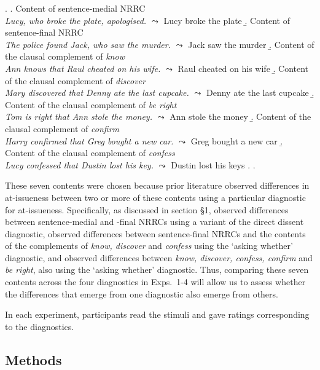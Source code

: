 \documentclass[times,linguex,xcolor]{glossa}
\begin{document}
  \ex.\label{stims}
    \a.\label{stims.a} Content of sentence-medial NRRC \\
      \emph{Lucy, who broke the plate, apologised.} $\leadsto$ Lucy broke the plate
    \b.\label{stims.b} Content of sentence-final NRRC \\
    \emph{The police found Jack, who saw the murder.} $\leadsto$ Jack saw the murder
    \b.\label{stims.c} Content of the clausal complement of \emph{know} \\
    \emph{Ann knows that Raul cheated on his wife.} $\leadsto$ Raul cheated on his wife
    \b.\label{stims.d} Content of the clausal complement of \emph{discover} \\
    \emph{Mary discovered that Denny ate the last cupcake.} $\leadsto$ Denny ate the last cupcake
    \b.\label{stims.e} Content of the clausal complement of \emph{be right} \\
    \emph{Tom is right that Ann stole the money.} $\leadsto$ Ann stole the money
    \b.\label{stims.f} Content of the clausal complement of \emph{confirm} \\
    \emph{Harry confirmed that Greg bought a new car.} $\leadsto$ Greg bought a new car
    \b.\label{stims.g} Content of the clausal complement of \emph{confess}  \\
    \emph{Lucy confessed that Dustin lost his key.} $\leadsto$ Dustin lost his keys
    \z.
  \z.
  
These seven contents were chosen because prior literature observed differences in at-issueness between two or more of these contents using a particular diagnostic for at-issueness.  Specifically, as discussed in section \S1, \citealt{syrett_experimental_2015} observed differences between sentence-medial and -final NRRCs using a variant of the direct dissent diagnostic, \citealt{tonhauser_how_2018} observed differences between sentence-final NRRCs and the contents of the complements of \emph{know, discover} and \emph{confess} using the `asking whether' diagnostic, and \citealt{degen-tonhauser-glossa} observed differences between \emph{know, discover, confess, confirm} and \emph{be right}, also using the `asking whether' diagnostic. Thus, comparing these seven contents across the four diagnostics in Exps.~1-4 will allow us to assess whether the differences that emerge from one diagnostic also emerge from others. 

  In each experiment, participants read the stimuli and gave ratings corresponding to the diagnostics.

  \subsection{Methods}
    
\end{document}
